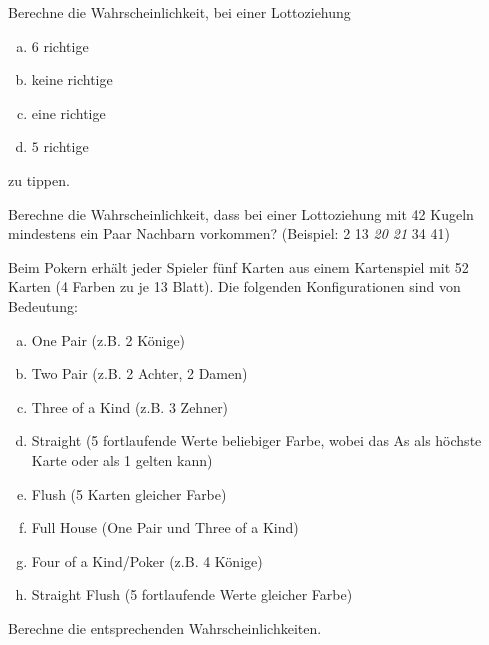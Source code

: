 \documentclass[%
11pt,%
twoside,%
titlepage,%
german,%
headsepline%
]{scrartcl}
\begin{document}
\begin{ueb}[Lotto]
Berechne
die Wahrscheinlichkeit, bei einer Lottoziehung

\begin{minipage}{0.45\textwidth}
\begin{enumerate}[a)]
\item $6$ richtige
\item keine richtige
\end{enumerate}
\end{minipage}
\begin{minipage}{0.45\textwidth}
\begin{enumerate}[a)]
\setcounter{enumi}{2}
\item eine richtige
\item $5$ richtige
\end{enumerate}
\end{minipage}

zu tippen.
\end{ueb}

\begin{ueb}
Berechne
die Wahrscheinlichkeit, dass bei einer Lottoziehung mit 42 Kugeln mindestens ein Paar Nachbarn vorkommen? (Beispiel: 2 13 \emph{20 21} 34 41)
\end{ueb}

\begin{ueb}
Beim
Pokern
erhält jeder Spieler fünf Karten aus einem Kartenspiel mit 52 Karten (4 Farben zu je 13 Blatt). Die folgenden Konfigurationen sind von Bedeutung:
\begin{enumerate}[a)]
\item One Pair (z.B. 2 Könige)
\item Two Pair (z.B. 2 Achter, 2 Damen)
\item Three of a Kind (z.B. 3 Zehner)
\item Straight (5 fortlaufende Werte beliebiger Farbe, wobei das As als höchste Karte oder als 1 gelten
kann)
\item Flush (5 Karten gleicher Farbe)
\item Full House (One Pair und Three of a Kind)
\item Four of a Kind/Poker (z.B. 4 Könige)
\item Straight Flush (5 fortlaufende Werte gleicher Farbe)
\end{enumerate}
Berechne die entsprechenden Wahrscheinlichkeiten.
\end{ueb}
\end{document}
